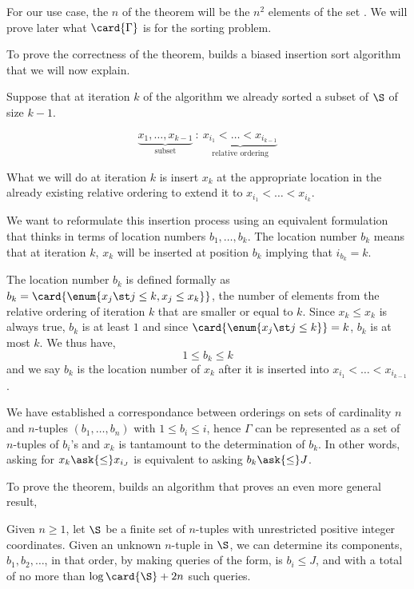 For our use case, the $n$ of the theorem will be the $n^2$ elements of the set
\XY. We will prove later what $\card{\Gamma}$ is for the sorting \XY problem.

To prove the correctness of the theorem, \citet{fredman:1976} builds a biased
insertion sort algorithm that we will now explain.

Suppose that at iteration $k$ of the algorithm
we already sorted a subset of $\S$ of size $k-1$.

$$\underbrace{x_1, \ldots, x_{k-1}}_{\text{subset}}~:~\underbrace{x_{i_1} <
\ldots < x_{i_{k-1}}}_{\text{relative ordering}}$$

What we will do at iteration $k$ is insert $x_k$ at the appropriate location
in the already existing relative ordering to extend it to $x_{i_1} < \ldots <
x_{i_k}$.

We want to reformulate this insertion process using an equivalent formulation
that thinks in terms of location numbers $b_1, \ldots, b_k$. The location
number $b_k$ means that at iteration $k$, $x_k$ will be inserted at position
$b_k$ implying that $i_{b_k} = k$.

The location number $b_k$ is defined formally as $b_k = \card{\enum{x_j \st j
\le k, x_j \le x_k}}$, \ie the number of elements from the relative ordering
of iteration $k$ that are smaller or equal to $k$. Since $x_k \le x_k$ is
always true, $b_k$ is at least $1$ and since $\card{\enum{x_j \st j \le k}} =
k$, $b_k$ is at most $k$. We thus have,
$$ 1 \le b_k \le k$$
and we say $b_k$ is the location number of $x_k$ after it is inserted into
$x_{i_1} < \ldots < x_{i_{k-1}}$.

We have established a correspondance between orderings on sets of cardinality
$n$ and $n$-tuples $(b_1, \ldots, b_n)$ with $1 \le b_i \le i$, hence $\Gamma$
can be represented as a set of $n$-tuples of $b_i$'s and $x_k$ is tantamount to
the determination of $b_k$. In other words, asking for $x_k \ask{\le} x_{i_J}$
is equivalent to asking $b_k \ask{\le} J$.

To prove the theorem, \citet{fredman:1976} builds an algorithm that proves an
even more general result,

\begin{lemma}
Given $n \ge 1$, let $\S$ be a finite set of $n$-tuples with unrestricted
positive integer coordinates. Given an unknown $n$-tuple in $\S$, we can
determine its components, $b_1, b_2, \ldots$, in that order, by making queries
of the form, is $b_i \le J$, and with a total of no more than $\log \card{\S}
+ 2n$ such queries.
\end{lemma}

